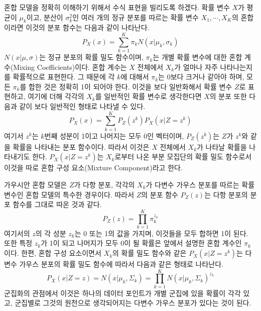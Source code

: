 \documentclass[a4paper]{oblivoir}
\begin{document}
혼합 모델을 정확히 이해하기 위해서 수식 표현을 빌리도록 하겠다. 확률 변수 $X$가 평균이 $\mu_k$이고, 분산이 $\sigma_{k}^{2}$인 여러 개의 정규 분포를 따르는 확률 변수 $X_{1},\cdots,X_{K}$의 혼합이라면 이것의 분포 함수는 다음과 같이 나타난다. 
\begin{equation}
P_{X}(x) = \sum_{k=1}^{K} \pi_{k} N(x|\mu_k,\sigma_{k}) \label{eq:8-21} 
\end{equation}
$N(x|\mu,\sigma)$는 정규 분포의 확률 밀도 함수이며, $\pi_{k}$는 개별 확률 변수에 대한 혼합 계수(Mixing Coefficients)이다. 혼합 계수는 $X$ 전체에서 $X_{k}$가 얼마나 자주 나타나는지를 확률적으로 표현한다. 그 때문에 각 $k$에 대해서 $\pi_{k}$는 0보다 크거나 같아야 하며, 모든 $\pi_{k}$를 합한 것은 정확히 1이 되어야 한다. 이것을 보다 일반화해서 확률 변수 $Z$로 표현하고, 여기에 더해 각각의 $X_{k}$를 일반적인 확률 변수로 생각한다면 $X$의 분포 또한 다음과 같이 보다 일반적인 형태로 나타낼 수 있다. 
\begin{equation}
P_{X}(x) = \sum_{k=1}^{K} P_{Z}(z^k) P_{X}(x|Z=z^k) \label{eq:8-22} 
\end{equation}
여기서 $z^k$는 $k$번째 성분이 1이고 나머지는 모두 0인 벡터이며, $P_{Z}(z^k)$는 $Z$가 $z^k$와 같을 확률을 나타내는 분포 함수이다. 따라서 이것은 $X$ 전체에서 $X_{k}$가 나타날 확률을 나타내기도 한다. $P_{X}(x|Z=z^k)$는 $X_{k}$로부터 나온 부분 모집단의 확률 밀도 함수로서 이것을 따로 혼합 구성 요소(Mixture Component)라고 한다. 

가우시안 혼합 모델은 $Z$가 다항 분포, 각각의 $X_{k}$가 다변수 가우스 분포를 따르는 확률 변수인 혼합 모델의 특수한 경우이다. 따라서 $Z$의 분포 함수 $P_{Z}(z)$는 다항 분포의 분포 함수를 그대로 따온 것과 같다. 
\begin{equation}
P_{Z}(z) = \prod_{k=1}^{K} \pi_{k}^{z_k} \label{eq:8-23} 
\end{equation}
여기서의 $z$의 각 성분 $z_k$는 0 또는 1의 값을 가지며, 이것들을 모두 합하면 1이 된다. 또한 특정 $z_k$가 1이 되고 나머지가 모두 0이 될 확률은 앞에서 설명한 혼합 계수인 $\pi_{k}$이다. 한편, 혼합 구성 요소이면서 $X_k$의 확률 밀도 함수와 같은 $P_{X}(x|Z=z^{k})$는 다변수 가우스 분포의 확률 밀도 함수에 따라서 다음과 같은 형태로 나타난다. 
\begin{equation}
P_{X}(x|Z=z) = N(x|{\mu}_{k}, {\Sigma}_{k}) = \prod_{k=1}^{K} N(x|{\mu}_{k}, {\Sigma}_{k})^{z_{k}} \label{eq:8-24} 
\end{equation}
군집화의 관점에서 이것은 하나의 데이터 포인트가 개별 군집에 있을 확률이 각각 있고, 군집별로 그것의 원천으로 생각되어지는 다변수 가우스 분포가 있다는 것이 된다. \\
\end{document}
